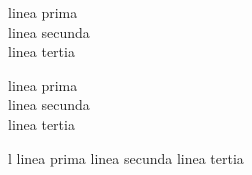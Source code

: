 \documentclass{scrbook}
\begin{document}
\beginnumbering
\pstart
\begin{edtabularl}
linea prima \\
linea secunda \\
linea tertia 
\end{edtabularl}
\pend
\pstart
\begin{edtabularl}
linea prima \\
linea secunda \\
linea tertia 
\end{edtabularl}
\pend

\pstart l%
linea prima 
linea secunda 
linea tertia 
\pend\endnumbering
\end{document}
